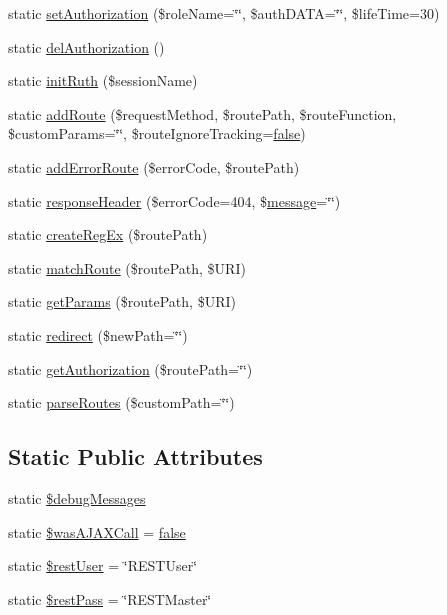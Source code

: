 \begin{DoxyCompactItemize}
\item 
static \hyperlink{classRuth_a2cbe3cd7c0d3dfadac54a6020d075607}{set\+Authorization} (\$role\+Name=\char`\"{}\char`\"{}, \$auth\+D\+A\+T\+A=\char`\"{}\char`\"{}, \$life\+Time=30)
\item 
static \hyperlink{classRuth_af751cee7c3766c478a09ea14ffc5ce99}{del\+Authorization} ()
\item 
static \hyperlink{classRuth_a2ce840061c470dee079816ec54bfc1f4}{init\+Ruth} (\$session\+Name)
\item 
static \hyperlink{classRuth_ad13bc87f60f8b74efd4c784fa2c49288}{add\+Route} (\$request\+Method, \$route\+Path, \$route\+Function, \$custom\+Params=\char`\"{}\char`\"{}, \$route\+Ignore\+Tracking=\hyperlink{tina4_8php_aec2deb5590a84bee262c3bea206ae88f}{false})
\item 
static \hyperlink{classRuth_a824d3cd236fd20d3f8cdc1865b8a3605}{add\+Error\+Route} (\$error\+Code, \$route\+Path)
\item 
static \hyperlink{classRuth_aba8f6d2223ff063fc5d0133d6f85f2c0}{response\+Header} (\$error\+Code=404, \$\hyperlink{Tessa_8php_a37ab31c170417027f819bfc053d7cd39}{message}=\char`\"{}\char`\"{})
\item 
static \hyperlink{classRuth_af382f8396d9d15c9d289b1024a974360}{create\+Reg\+Ex} (\$route\+Path)
\item 
static \hyperlink{classRuth_a4cc98adb973c4d46742b05a02ecb6ee3}{match\+Route} (\$route\+Path, \$U\+R\+I)
\item 
static \hyperlink{classRuth_aa8c09285cc5f2a214b8fbe5e45e88cea}{get\+Params} (\$route\+Path, \$U\+R\+I)
\item 
static \hyperlink{classRuth_a99efe91394d300de83f7124acea0b595}{redirect} (\$new\+Path=\char`\"{}\char`\"{})
\item 
static \hyperlink{classRuth_aa9bd38599bb5bd892ddf856c1687b04a}{get\+Authorization} (\$route\+Path=\char`\"{}\char`\"{})
\item 
static \hyperlink{classRuth_a0fbc42c3af4f62e230b4c3208ce9451c}{parse\+Routes} (\$custom\+Path=\char`\"{}\char`\"{})
\end{DoxyCompactItemize}
\subsection*{Static Public Attributes}
\begin{DoxyCompactItemize}
\item 
static \hyperlink{classRuth_abcc2411c11abe0c3675069f255db1f97}{\$debug\+Messages}
\item 
static \hyperlink{classRuth_aaaf0e436f08cbd148c492584832da4cc}{\$was\+A\+J\+A\+X\+Call} = \hyperlink{tina4_8php_aec2deb5590a84bee262c3bea206ae88f}{false}
\item 
static \hyperlink{classRuth_abe139defb62f176c0a077983561f9d86}{\$rest\+User} = \char`\"{}R\+E\+S\+T\+User\char`\"{}
\item 
static \hyperlink{classRuth_ab4e553a88d7384c2dd07158efe3dd933}{\$rest\+Pass} = \char`\"{}R\+E\+S\+T\+Master\char`\"{}
\end{DoxyCompactItemize}


